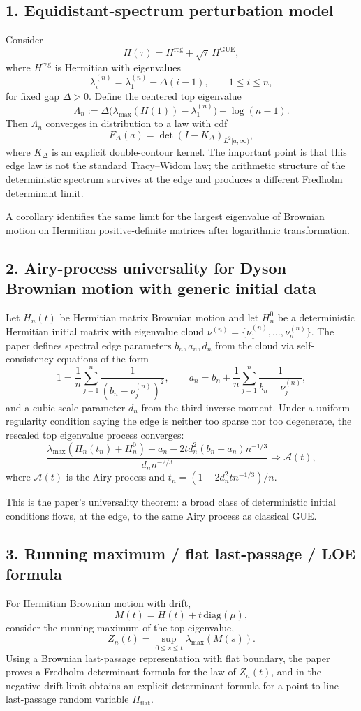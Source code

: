 \documentclass[11pt]{article}
\begin{document}
\subsection*{1. Equidistant-spectrum perturbation model}
Consider
\[
H(\tau)=H^{\mathrm{reg}}+\sqrt{\tau}\,H^{\mathrm{GUE}},
\]
where $H^{\mathrm{reg}}$ is Hermitian with eigenvalues
\[
\lambda_i^{(n)}=\lambda_1^{(n)}-\Delta(i-1),\qquad 1\le i\le n,
\]
for fixed gap $\Delta>0$. Define the centered top eigenvalue
\[
\Lambda_n:=\Delta\bigl(\lambda_{\max}(H(1)) - \lambda_1^{(n)}\bigr)-\log(n-1).
\]
Then $\Lambda_n$ converges in distribution to a law with cdf
\[
F_\Delta(a)=\det(I-K_\Delta)_{L^2[a,\infty)},
\]
where $K_\Delta$ is an explicit double-contour kernel. The important point is that this edge law is not the standard Tracy--Widom law; the arithmetic structure of the deterministic spectrum survives at the edge and produces a different Fredholm determinant limit.

A corollary identifies the same limit for the largest eigenvalue of Brownian motion on Hermitian positive-definite matrices after logarithmic transformation.

\subsection*{2. Airy-process universality for Dyson Brownian motion with generic initial data}
Let $H_n(t)$ be Hermitian matrix Brownian motion and let $H_n^0$ be a deterministic Hermitian initial matrix with eigenvalue cloud $\nu^{(n)}=\{\nu_1^{(n)},\dots,\nu_n^{(n)}\}$. The paper defines spectral edge parameters $b_n,a_n,d_n$ from the cloud via self-consistency equations of the form
\[
1=\frac1n\sum_{j=1}^n \frac{1}{(b_n-\nu_j^{(n)})^2},
\qquad
 a_n=b_n+\frac1n\sum_{j=1}^n\frac{1}{b_n-\nu_j^{(n)}},
\]
and a cubic-scale parameter $d_n$ from the third inverse moment. Under a uniform regularity condition saying the edge is neither too sparse nor too degenerate, the rescaled top eigenvalue process converges:
\[
\frac{\lambda_{\max}(H_n(t_n)+H_n^0)-a_n-2t d_n^2(b_n-a_n)n^{-1/3}}{d_n n^{-2/3}}
\Longrightarrow \mathcal{A}(t),
\]
where $\mathcal{A}(t)$ is the Airy process and $t_n=(1-2d_n^2tn^{-1/3})/n$.

This is the paper's universality theorem: a broad class of deterministic initial conditions flows, at the edge, to the same Airy process as classical GUE.

\subsection*{3. Running maximum / flat last-passage / LOE formula}
For Hermitian Brownian motion with drift,
\[
M(t)=H(t)+t\,\mathrm{diag}(\mu),
\]
consider the running maximum of the top eigenvalue,
\[
Z_n(t)=\sup_{0\le s\le t}\lambda_{\max}(M(s)).
\]
Using a Brownian last-passage representation with flat boundary, the paper proves a Fredholm determinant formula for the law of $Z_n(t)$, and in the negative-drift limit obtains an explicit determinant formula for a point-to-line last-passage random variable $\Pi_{\mathrm{flat}}$.
\end{document}
